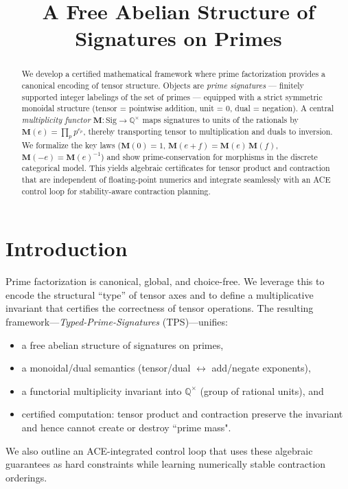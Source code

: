 \documentclass[11pt]{article}
\title{A Free Abelian Structure of Signatures on Primes}
\author{ }
\date{ }
\theoremstyle{plain}
\theoremstyle{definition}
\newcommand{\Q}{\mathbb{Q}}
\newcommand{\Sig}{\mathrm{Sig}}
\newcommand{\M}{\mathbf{M}} %
\begin{document}
\maketitle

\begin{abstract}
We develop a certified mathematical framework where prime factorization provides a canonical encoding of tensor structure. Objects are \emph{prime signatures} --- finitely supported integer labelings of the set of primes --- equipped with a strict symmetric monoidal structure (tensor = pointwise addition, unit = $0$, dual = negation). A central \emph{multiplicity functor} $\M:\Sig\to \Q^{\times}$ maps signatures to units of the rationals by $\M(e)=\prod_{p} p^{e_p}$, thereby transporting tensor to multiplication and duals to inversion. We formalize the key laws ($\M(0)=1$, $\M(e+f)=\M(e)\,\M(f)$, $\M(-e)=\M(e)^{-1}$) and show prime-conservation for morphisms in the discrete categorical model. This yields algebraic certificates for tensor product and contraction that are independent of floating-point numerics and integrate seamlessly with an ACE control loop for stability-aware contraction planning.
\end{abstract}

\tableofcontents

\section{Introduction}
\label{sec:intro}
Prime factorization is canonical, global, and choice-free. We leverage this to encode the structural ``type'' of tensor axes and to define a multiplicative invariant that certifies the correctness of tensor operations. The resulting framework---\emph{Typed-Prime-Signatures} (TPS)---unifies:
\begin{itemize}[leftmargin=*]
  \item a free abelian structure of signatures on primes,
  \item a monoidal/dual semantics (tensor/dual $\leftrightarrow$ add/negate exponents),
  \item a functorial multiplicity invariant into $\Q^{\times}$ (group of rational units), and
  \item certified computation: tensor product and contraction preserve the invariant and hence cannot create or destroy ``prime mass".
\end{itemize}
We also outline an ACE-integrated control loop that uses these algebraic guarantees as hard constraints while learning numerically stable contraction orderings.
\end{document}
